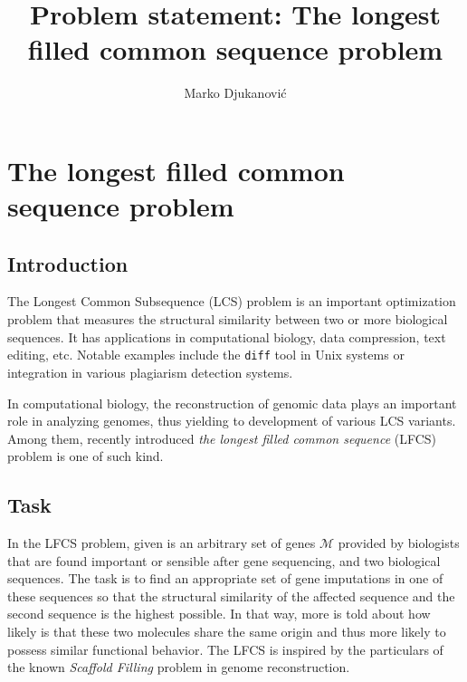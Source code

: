 \documentclass[]{article}
\title{\textbf{Problem statement: The longest filled common sequence problem} }
\author{Marko Djukanović}
\begin{document}
\maketitle



\section{The longest filled common sequence problem}

\subsection{Introduction}

The Longest Common Subsequence (LCS) problem is an important optimization problem that measures the structural similarity between two or more biological sequences.
It has applications in computational biology, data compression, text editing, etc. Notable examples include the \texttt{diff} tool in Unix systems or integration in various plagiarism detection systems. 

In computational biology, the reconstruction of genomic data plays an important role in analyzing genomes, thus yielding to development of various LCS variants. Among them, recently introduced \textit{the longest filled common sequence} (LFCS) problem is one of such kind. 


\subsection{Task}

In the LFCS problem, given is an arbitrary set of genes $\mathcal{M}$ provided by biologists that are found important or sensible after gene sequencing, and two biological sequences. The task is to find an appropriate set of gene imputations in one of these sequences so that the structural similarity of the affected sequence and the second sequence is the highest possible. In that way, more is told about how likely is that these two molecules share the same origin and thus more likely to possess similar functional behavior.  The LFCS is inspired by the particulars of the known \textit{Scaffold Filling} problem in genome reconstruction. 
\end{document}
